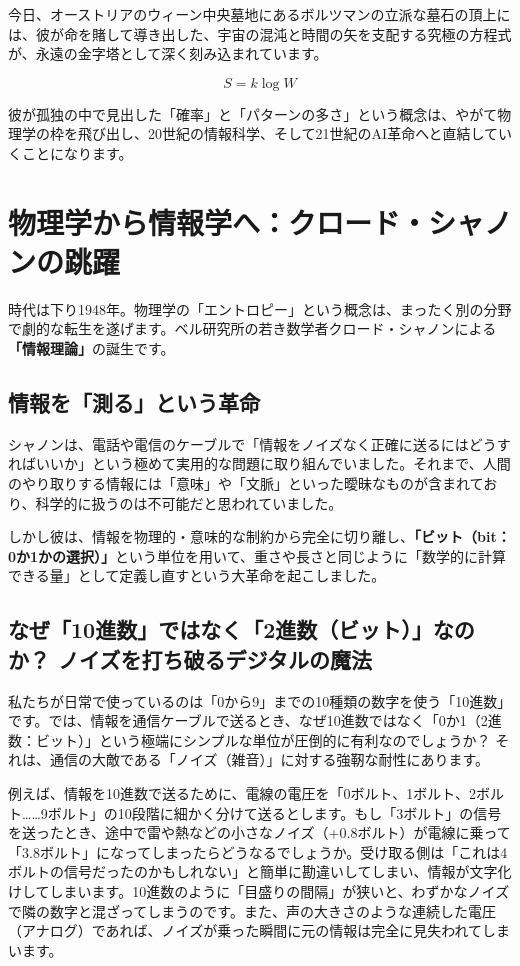 今日、オーストリアのウィーン中央墓地にあるボルツマンの立派な墓石の頂上には、彼が命を賭して導き出した、宇宙の混沌と時間の矢を支配する究極の方程式が、永遠の金字塔として深く刻み込まれています。

\[
S=k\log W
\]

彼が孤独の中で見出した「確率」と「パターンの多さ」という概念は、やがて物理学の枠を飛び出し、20世紀の情報科学、そして21世紀のAI革命へと直結していくことになります。

\section{物理学から情報学へ：クロード・シャノンの跳躍}

時代は下り1948年。物理学の「エントロピー」という概念は、まったく別の分野で劇的な転生を遂げます。ベル研究所の若き数学者クロード・シャノンによる\textbf{「情報理論」}の誕生です。

\subsection{情報を「測る」という革命}

シャノンは、電話や電信のケーブルで「情報をノイズなく正確に送るにはどうすればいいか」という極めて実用的な問題に取り組んでいました。それまで、人間のやり取りする情報には「意味」や「文脈」といった曖昧なものが含まれており、科学的に扱うのは不可能だと思われていました。

しかし彼は、情報を物理的・意味的な制約から完全に切り離し、\textbf{「ビット（bit：0か1かの選択）」}という単位を用いて、重さや長さと同じように「数学的に計算できる量」として定義し直すという大革命を起こしました。

\subsection{なぜ「10進数」ではなく「2進数（ビット）」なのか？ ノイズを打ち破るデジタルの魔法}

私たちが日常で使っているのは「0から9」までの10種類の数字を使う「10進数」です。では、情報を通信ケーブルで送るとき、なぜ10進数ではなく「0か1（2進数：ビット）」という極端にシンプルな単位が圧倒的に有利なのでしょうか？ それは、通信の大敵である「ノイズ（雑音）」に対する強靭な耐性にあります。

例えば、情報を10進数で送るために、電線の電圧を「0ボルト、1ボルト、2ボルト\ldots{}\ldots{}9ボルト」の10段階に細かく分けて送るとします。もし「3ボルト」の信号を送ったとき、途中で雷や熱などの小さなノイズ（+0.8ボルト）が電線に乗って「3.8ボルト」になってしまったらどうなるでしょうか。受け取る側は「これは4ボルトの信号だったのかもしれない」と簡単に勘違いしてしまい、情報が文字化けしてしまいます。10進数のように「目盛りの間隔」が狭いと、わずかなノイズで隣の数字と混ざってしまうのです。また、声の大きさのような連続した電圧（アナログ）であれば、ノイズが乗った瞬間に元の情報は完全に見失われてしまいます。

